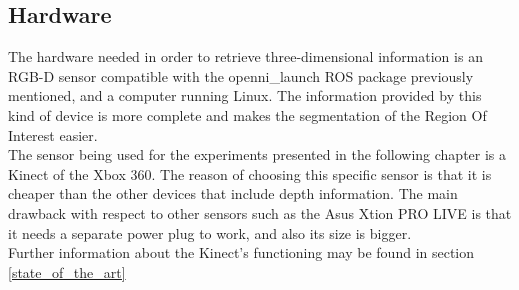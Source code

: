	\subsection{Hardware}
		\label{technologies_hardware}

		The hardware needed in order to retrieve three-dimensional information is an RGB-D sensor compatible with the openni\_launch ROS package previously mentioned, and a computer running Linux. The information provided by this kind of device is more complete and makes the segmentation of the Region Of Interest easier. \\

		The sensor being used for the experiments presented in the following chapter is a Kinect of the Xbox 360. The reason of choosing this specific sensor is that it is cheaper than the other devices that include depth information. The main drawback with respect to other sensors such as the Asus Xtion PRO LIVE\cite{xtion} is that it needs a separate power plug to work, and also its size is bigger. 
		\\

		Further information about the Kinect's functioning may be found in section \ref{state_of_the_art}




			



